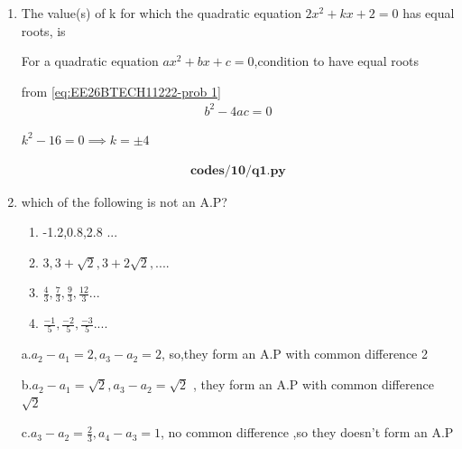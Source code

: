 \begin{enumerate}[label=\thesubsection.\arabic*, ref=\thesubsection.\theenumi]
	
	
	\item The value(s) of k for which the quadratic equation $2x^2 + kx + 2 = 0$ has equal roots, is
	\begin{enumerate}
	\end{enumerate}
	
	\solution 
	
	For a quadratic equation $ ax^2+bx+c=0$,condition to have equal roots 
	
	from \eqref{eq:EE26BTECH11222-prob 1}
	\begin{align}
		b^2-4ac=0    
	\end{align}
	
	$k^2-16=0 \implies k=\pm 4$
	
	\begin{align}
		\textbf{codes/10/q1.py}
	\end{align}
	\item which of the following is not an A.P?
	\begin{enumerate}
		
		
		\item -1.2,0.8,2.8 ...
		
		\item$3,3+\sqrt{2},3+2\sqrt{2},....$
		
		\item$\frac{4}{3},\frac{7}{3},\frac{9}{3},\frac{12}{3}...$
		
		\item$\frac{-1}{5},\frac{-2}{5},\frac{-3}{5}....$
		
		
	\end{enumerate}
	\solution 
	
	a.$a_2-a_1= 2,a_3-a_2=2 $, so,they form an A.P with common difference 2
	
	b.$a_2-a_1=\sqrt{2}, a_3-a_2=\sqrt{2}$ , they form an A.P with common difference $\sqrt{2}$
	
	c.$a_3-a_2=\frac{2}{3},a_4-a_3=1$, no common difference ,so they doesn't form an A.P
	

\end{enumerate}
